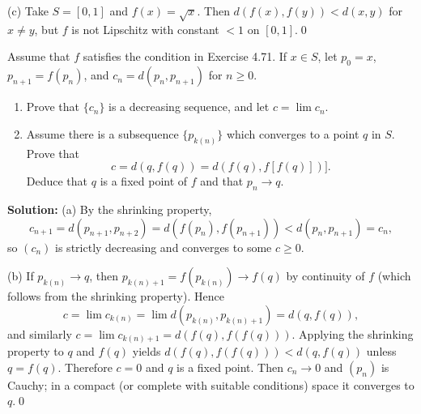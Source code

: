 (c) Take $S=[0,1]$ and $f(x)=\sqrt{x}$. Then $d(f(x),f(y))<d(x,y)$ for $x\ne y$, but $f$ is not Lipschitz with constant $<1$ on $[0,1]$.\qed



\begin{problembox}
Assume that $f$ satisfies the condition in Exercise 4.71. If $x \in S$, let $p_0 = x$, $p_{n+1} = f(p_n)$, and $c_n = d(p_n, p_{n+1})$ for $n \geq 0$.
\begin{enumerate}[label=(\alph*)]
\item Prove that $\{c_n\}$ is a decreasing sequence, and let $c = \lim c_n$.
\item Assume there is a subsequence $\{p_{k(n)}\}$ which converges to a point $q$ in $S$. Prove that
\[c = d(q, f(q)) = d(f(q), f[f(q)])].\]
Deduce that $q$ is a fixed point of $f$ and that $p_n \to q$.
\end{enumerate}
\end{problembox}

\noindent\textbf{Solution:}
(a) By the shrinking property,
\[
c_{n+1}=d(p_{n+1},p_{n+2})=d(f(p_n),f(p_{n+1}))<d(p_n,p_{n+1})=c_n,
\]
so $(c_n)$ is strictly decreasing and converges to some $c\ge 0$.

(b) If $p_{k(n)}\to q$, then $p_{k(n)+1}=f(p_{k(n)})\to f(q)$ by continuity of $f$ (which follows from the shrinking property). Hence
\[
c=\lim c_{k(n)}=\lim d(p_{k(n)},p_{k(n)+1})=d(q,f(q)),
\]
and similarly $c=\lim c_{k(n)+1}=d(f(q),f(f(q)))$. Applying the shrinking property to $q$ and $f(q)$ yields $d(f(q),f(f(q)))<d(q,f(q))$ unless $q=f(q)$. Therefore $c=0$ and $q$ is a fixed point. Then $c_n\to 0$ and $(p_n)$ is Cauchy; in a compact (or complete with suitable conditions) space it converges to $q$.\qed
